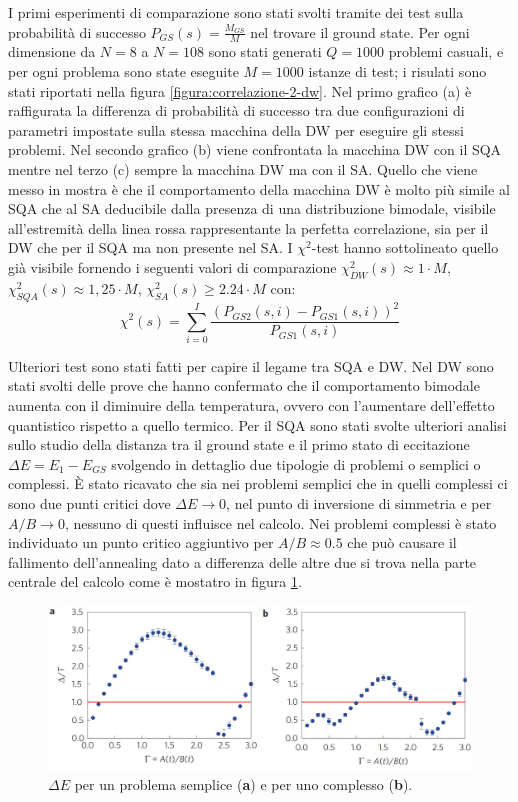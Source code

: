 I primi esperimenti di comparazione sono stati svolti tramite dei test sulla probabilità di successo $P_{GS}(s) = \frac{M_{GS}}{M}$ nel trovare il ground state. Per ogni dimensione da $N=8$ a $N=108$ sono stati generati $Q=1000$ problemi casuali, e per ogni problema sono state eseguite $M=1000$ istanze di test; i risulati sono stati riportati nella figura \ref{figura:correlazione-2-dw}.
Nel primo grafico (a) è raffigurata la differenza di probabilità di successo tra due configurazioni di parametri impostate sulla stessa macchina della DW per eseguire gli stessi problemi. Nel secondo grafico (b) viene confrontata la macchina DW con il SQA mentre nel terzo (c) sempre la macchina DW ma con il SA. Quello che viene messo in mostra è che il comportamento della macchina DW è molto più simile al SQA che al SA deducibile dalla presenza di una distribuzione bimodale, visibile all'estremità della linea rossa rappresentante la perfetta correlazione, sia per il DW che per il SQA ma non presente nel SA.
I $\chi^2$-test hanno sottolineato quello già visibile fornendo i seguenti valori di comparazione $\chi_{DW}^2(s) \approx 1 \cdot M$, $\chi_{SQA}^2(s) \approx 1,25 \cdot M$, $\chi_{SA}^2(s) \geq 2.24 \cdot M$ con:
$$\chi^2(s) = \sum_{i=0}^I \frac{(P_{GS2}(s, i) -P_{GS1}(s, i))^2}{P_{GS1}(s, i)}$$

Ulteriori test sono stati fatti per capire il legame tra SQA e DW. Nel DW sono stati svolti delle prove che hanno confermato che il comportamento bimodale aumenta con il diminuire della temperatura, ovvero con l'aumentare dell'effetto quantistico rispetto a quello termico. Per il SQA sono stati svolte ulteriori analisi sullo studio della distanza tra il ground state e il primo stato di eccitazione $\Delta E = E_{1} - E_{GS}$ svolgendo in dettaglio due tipologie di problemi o semplici o complessi. È stato ricavato che sia nei problemi semplici che in quelli complessi ci sono due punti critici dove $\Delta E \to 0$, nel punto di inversione di simmetria e per $A/B \to 0$, nessuno di questi influisce nel calcolo. Nei problemi complessi è stato individuato un punto critico aggiuntivo per $A/B \approx 0.5$ che può causare il fallimento dell'annealing dato a differenza delle altre due si trova nella parte centrale del calcolo come è mostatro in figura \ref{figura:ground-state-gap}.

\begin{figure}[htbp]
  \centering
  \includegraphics[scale=0.38]{Immagini/ground-state-gap.jpg}
  \caption{$\Delta E$ per un problema semplice (\textbf{a}) e per uno complesso (\textbf{b}).}
  \label{figura:ground-state-gap}
\end{figure}

